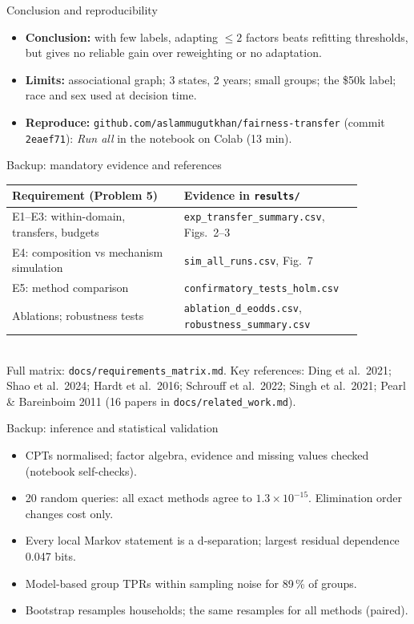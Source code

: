 \documentclass[aspectratio=169,11pt]{beamer}
\begin{document}
\begin{frame}{Conclusion and reproducibility}
\begin{itemize}[<+->]
\item \textbf{Conclusion:} with few labels, adapting $\le 2$ factors beats refitting thresholds, but gives no reliable
gain over reweighting or no adaptation.
\item \textbf{Limits:} associational graph; 3 states, 2 years; small groups; the \$50k label; race and sex used at
decision time.
\item \textbf{Reproduce:} \texttt{github.com/aslammugutkhan/fairness-transfer} (commit \texttt{2eaef71}): \emph{Run all} in the notebook on Colab (13 min).
\end{itemize}
\end{frame}

\appendix
\begin{frame}{Backup: mandatory evidence and references}
\small
\begin{tabular}{p{0.45\linewidth}p{0.42\linewidth}}\toprule
Requirement (Problem 5) & Evidence in \texttt{results/}\\\midrule
E1--E3: within-domain, transfers, budgets & \texttt{exp\_transfer\_summary.csv}, Figs.\ 2--3\\
E4: composition vs mechanism simulation & \texttt{sim\_all\_runs.csv}, Fig.\ 7\\
E5: method comparison & \texttt{confirmatory\_tests\_holm.csv}\\
Ablations; robustness tests & \texttt{ablation\_d\_eodds.csv}, \texttt{robustness\_summary.csv}\\\bottomrule
\end{tabular}\\[6pt]
\footnotesize Full matrix: \texttt{docs/requirements\_matrix.md}. Key references: Ding et al.\ 2021; Shao et al.\
2024; Hardt et al.\ 2016; Schrouff et al.\ 2022; Singh et al.\ 2021; Pearl \& Bareinboim 2011
(16 papers in \texttt{docs/related\_work.md}).
\end{frame}

\begin{frame}{Backup: inference and statistical validation}
\begin{itemize}
\item CPTs normalised; factor algebra, evidence and missing values checked (notebook self-checks).
\item 20 random queries: all exact methods agree to $1.3\times10^{-15}$. Elimination order changes cost only.
\item Every local Markov statement is a d-separation; largest residual dependence 0.047 bits.
\item Model-based group TPRs within sampling noise for 89\,\% of groups.
\item Bootstrap resamples households; the same resamples for all methods (paired).
\end{itemize}
\end{frame}
\end{document}
